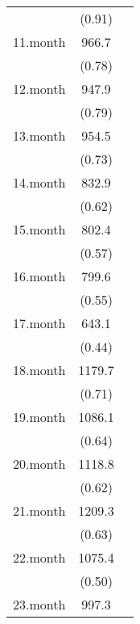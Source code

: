 {\begin{tabular}{l*{2}{c}}
            &      (0.91)         &                     \\
[1em]
11.month    &       966.7         &                     \\
            &      (0.78)         &                     \\
[1em]
12.month    &       947.9         &                     \\
            &      (0.79)         &                     \\
[1em]
13.month    &       954.5         &                     \\
            &      (0.73)         &                     \\
[1em]
14.month    &       832.9         &                     \\
            &      (0.62)         &                     \\
[1em]
15.month    &       802.4         &                     \\
            &      (0.57)         &                     \\
[1em]
16.month    &       799.6         &                     \\
            &      (0.55)         &                     \\
[1em]
17.month    &       643.1         &                     \\
            &      (0.44)         &                     \\
[1em]
18.month    &      1179.7         &                     \\
            &      (0.71)         &                     \\
[1em]
19.month    &      1086.1         &                     \\
            &      (0.64)         &                     \\
[1em]
20.month    &      1118.8         &                     \\
            &      (0.62)         &                     \\
[1em]
21.month    &      1209.3         &                     \\
            &      (0.63)         &                     \\
[1em]
22.month    &      1075.4         &                     \\
            &      (0.50)         &                     \\
[1em]
23.month    &       997.3         &                     \\

\end{tabular}}
